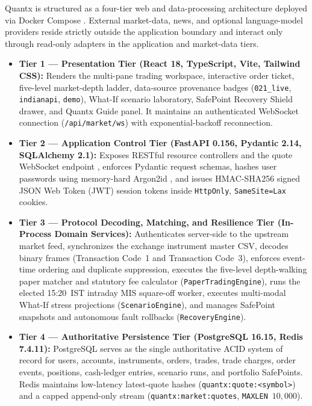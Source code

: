 \documentclass[journal,onecolumn,10pt]{IEEEtran}
\begin{document}
Quantx is structured as a four-tier web and data-processing architecture deployed via Docker Compose \cite{quantx_software}. External market-data, news, and optional language-model providers reside strictly outside the application boundary and interact only through read-only adapters in the application and market-data tiers.
\begin{itemize}
  \item \textbf{Tier 1 --- Presentation Tier (React 18, TypeScript, Vite, Tailwind CSS):} Renders the multi-pane trading workspace, interactive order ticket, five-level market-depth ladder, data-source provenance badges (\texttt{021\_live}, \texttt{indianapi}, \texttt{demo}), What-If scenario laboratory, SafePoint Recovery Shield drawer, and Quantx Guide panel. It maintains an authenticated WebSocket connection (\texttt{/api/market/ws}) with exponential-backoff reconnection.
  \item \textbf{Tier 2 --- Application Control Tier (FastAPI 0.156, Pydantic 2.14, SQLAlchemy 2.1):} Exposes RESTful resource controllers \cite{fielding2000} and the quote WebSocket endpoint \cite{rfc6455}, enforces Pydantic request schemas, hashes user passwords using memory-hard Argon2id \cite{biryukov2016}, and issues HMAC-SHA256 signed JSON Web Token (JWT) session tokens \cite{rfc7519} inside \texttt{HttpOnly}, \texttt{SameSite=Lax} cookies.
  \item \textbf{Tier 3 --- Protocol Decoding, Matching, and Resilience Tier (In-Process Domain Services):} Authenticates server-side to the upstream market feed, synchronizes the exchange instrument master CSV, decodes binary frames (Transaction Code~1 and Transaction Code~3), enforces event-time ordering and duplicate suppression, executes the five-level depth-walking paper matcher and statutory fee calculator (\texttt{PaperTradingEngine}), runs the elected 15:20~IST intraday MIS square-off worker, executes multi-modal What-If stress projections (\texttt{ScenarioEngine}), and manages SafePoint snapshots and autonomous fault rollbacks (\texttt{RecoveryEngine}).
  \item \textbf{Tier 4 --- Authoritative Persistence Tier (PostgreSQL 16.15, Redis 7.4.11):} PostgreSQL serves as the single authoritative ACID system of record for users, accounts, instruments, orders, trades, trade charges, order events, positions, cash-ledger entries, scenario runs, and portfolio SafePoints. Redis maintains low-latency latest-quote hashes (\texttt{quantx:quote:<symbol>}) and a capped append-only stream (\texttt{quantx:market:quotes}, \texttt{MAXLEN}~$10{,}000$).
\end{itemize}
\end{document}
